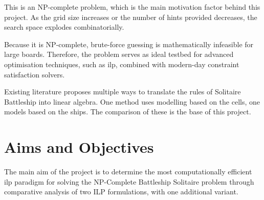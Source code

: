 This is an NP-complete problem, which is the main motivation factor behind this project. As the grid size increases or the number of hints provided decreases, the search space explodes combinatorially.

Because it is NP-complete, brute-force guessing is mathematically infeasible for large boards. Therefore, the problem serves as ideal testbed for advanced optimisation techniques, such as \gls{ilp}, combined with modern-day constraint satisfaction solvers.

Existing literature proposes multiple ways to translate the rules of Solitaire Battleship into linear algebra. One method uses modelling based on the cells, one models based on the ships. The comparison of these is the base of this project. 




\section{Aims and Objectives}\label{sec:objectives}

The main aim of the project is to determine the most computationally efficient \gls{ilp} paradigm for solving the NP-Complete Battleship Solitaire problem through comparative analysis of two ILP formulations, with one additional variant.

